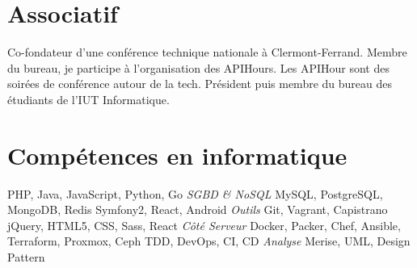 \documentclass[11pt,a4paper]{moderncv}
\begin{document}
    \section{Associatif}
        {
          Co-fondateur d'une conférence technique nationale à Clermont-Ferrand.
        }
        {
          Membre du bureau, je participe à l'organisation des APIHours. Les
          APIHour sont \newline{}des soirées de conférence autour de la tech.
        }
        {
          Président puis membre du bureau des étudiants de l'IUT Informatique.
        }

    \section{Compétences en informatique}
         {PHP, Java, JavaScript, Python, Go}
            {\textit{SGBD \& NoSQL}} {MySQL, PostgreSQL, MongoDB, Redis}
         {Symfony2, React, Android }
            {\textit{Outils}} {Git, Vagrant, Capistrano}
         {jQuery, HTML5, CSS, Sass, React}
            {\textit{Côté Serveur}} {Docker, Packer, Chef, Ansible, Terraform, Proxmox, Ceph}
         {TDD, DevOps, CI, CD}
            {\textit{Analyse}} {Merise, UML, Design Pattern}
\end{document}
